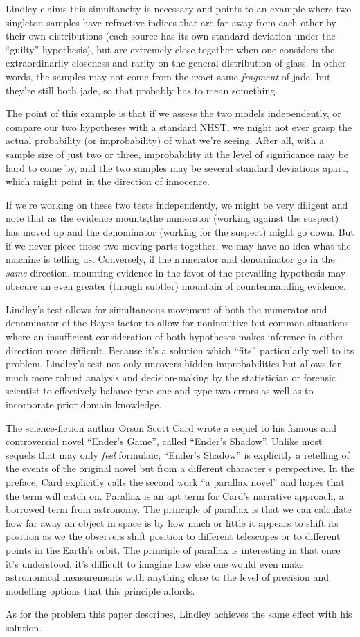 \documentclass{article}
\begin{document}
Lindley claims this simultaneity is necessary
and points to an example where two singleton samples have refractive indices that are far away
from each other by their own distributions (each source has
its own standard deviation under the ``guilty'' hypothesis), 
but are extremely close together when one considers the extraordinarily closeness and rarity on the general distribution
of glass. In other words, the samples may not come from the exact same \textit{fragment} of jade, but they're still both jade,
so that probably has to mean something.

The point of this example is that if we assess the two models independently, or compare our two hypotheses with a standard NHST,
we might not ever grasp the actual probability (or improbability) of what we're seeing. After all,
with a sample size of just two or three, improbability at the level of significance may be hard to come by,
and the two samples may be several standard deviations apart, which might point in the direction of innocence.

If we're working on these two tests independently, 
we might be very diligent and note that as the evidence mounts,the numerator (working against the suspect) has moved up
and the denominator (working for the suspect) might go down. But if we never piece these two moving parts together, we may have
no idea what the machine is telling us. Conversely, if the numerator and denominator
go in the \textit{same} direction, mounting evidence in the favor of the prevailing hypothesis may
obscure an even greater (though subtler) mountain of countermanding evidence.

Lindley's test allows for simultaneous movement of both the numerator and denominator of the Bayes factor
to allow for nonintuitive-but-common situations where an insufficient consideration of both hypotheses
makes inference in either direction more difficult.
Because it's a solution which ``fits'' particularly well to its problem,
Lindley's test not only uncovers hidden improbabilities but allows for much more robust analysis and decision-making
by the statistician or forensic scientist to effectively balance type-one and type-two errors as well as to
incorporate prior domain knowledge.

The science-fiction author
Orson Scott Card wrote a sequel to his famous and controversial novel ``Ender's Game'', called ``Ender's Shadow''. Unlike most
sequels that may only \textit{feel} formulaic, ``Ender's Shadow'' is explicitly a retelling of the events of the original novel
but from a different character's perspective. In the preface, Card explicitly calls the second work ``a parallax novel''
and hopes that the term will catch on. Parallax is an apt term for Card's narrative approach,
a borrowed term from astronomy. The principle of parallax is that
we can calculate how far away an object in space is by how much or little it appears to shift its position
as we the observers shift position to different telescopes or to different points in the Earth's orbit.
The principle of parallax is interesting in that once it's understood, it's difficult to imagine
how else one would even make astronomical measurements with anything close to the 
level of precision and modelling options that this principle affords.

As for the problem this paper describes, Lindley achieves the same effect with his solution.
\end{document}
